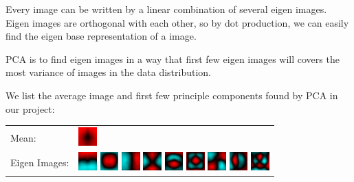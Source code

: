 \documentclass{acm_proc_article-sp}
\begin{document}
Every image can be written by a linear combination of several eigen images.
Eigen images are orthogonal with each other, so by dot production, we can
easily find the eigen base representation of a image.

PCA is to find eigen images in a way that first few eigen images will covers
the most variance of images in the data distribution.

We list the average image and first few principle components found by PCA in
our project:

\begin{tabular}{p{1.3cm}p{6cm}}
    Mean: &\includegraphics[width=20pt]{../data/PCA_visualize/eigvec0.png} \\ 
    Eigen Images: &
        \includegraphics[width=20pt]{../data/PCA_visualize/eigvec1.png}
        \includegraphics[width=20pt]{../data/PCA_visualize/eigvec2.png}
        \includegraphics[width=20pt]{../data/PCA_visualize/eigvec3.png}
        \includegraphics[width=20pt]{../data/PCA_visualize/eigvec4.png}
        \includegraphics[width=20pt]{../data/PCA_visualize/eigvec5.png}
        \includegraphics[width=20pt]{../data/PCA_visualize/eigvec6.png}
        \includegraphics[width=20pt]{../data/PCA_visualize/eigvec7.png}
        \includegraphics[width=20pt]{../data/PCA_visualize/eigvec8.png}
        \includegraphics[width=20pt]{../data/PCA_visualize/eigvec9.png}

\end{tabular}
\end{document}
